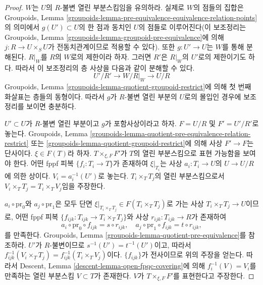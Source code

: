 \begin{proof}
$W$는 $U$의 $R$-불변 열린 부분스킴임을 유의하라. 실제로 $W$의
점들의 집합은 Groupoids, Lemma
\ref{groupoids-lemma-pre-equivalence-equivalence-relation-points}의 의미에서
$g(U') \subset U$의 한 점과 동치인 $U$의 점들로 이루어진다(이
보조정리는 Groupoids, Lemma
\ref{groupoids-lemma-groupoid-pre-equivalence}에 의해
$j : R \to U \times_S U$가 전동치관계이므로 적용할 수 있다).
또한 $g : U' \to U$는 $W$를 통해 분해된다. $R|_W$를 $R$의 $W$로의
제한이라 하자. 그러면 $R'$은 $R|_W$의 $U'$로의 제한이기도 하다.
따라서 이 보조정리의 층 사상을 다음과 같이 분해할 수 있다.
$$
U'/R' \longrightarrow W/R|_W \longrightarrow U/R
$$
Groupoids, Lemma \ref{groupoids-lemma-quotient-groupoid-restrict}에 의해
첫 번째 화살표는 층들의 동형이다. 따라서 $g$가 $R$-불변 열린 부분의
$U$로의 몰입인 경우에 보조정리를 보이면 충분하다.

\medskip\noindent
$U' \subset U$가 $R$-불변 열린 부분이고 $g$가 포함사상이라고 하자.
$F = U/R$ 및 $F' = U'/R'$로 놓는다. Groupoids, Lemma
\ref{groupoids-lemma-quotient-pre-equivalence-relation-restrict} 또는
\ref{groupoids-lemma-quotient-groupoid-restrict}에 의해 사상 $F' \to F$는
단사이다. $\xi \in F(T)$라 하자. $T \times_{\xi, F} F'$가 $T$의 열린
부분스킴으로 표현 가능함을 보여야 한다. 어떤 fppf 피복
$\{f_i : T_i \to T\}$가 존재하여 $\xi|_{T_i}$는 사상
$a_i : T_i \to U$의 $U \to U/R$에 의한 상이다.
$V_i = a_i^{-1}(U')$로 놓는다. $T_i \times_T T_j$의 열린 부분스킴으로서
$V_i \times_T T_j = T_i \times_T V_j$임을 주장한다.

\medskip\noindent
$a_i \circ \text{pr}_0$와 $a_j \circ \text{pr}_1$은 모두 단면
$\xi|_{T_i \times_T T_j} \in F(T_i \times_T T_j)$로 가는 사상
$T_i \times_T T_j \to U$이므로, 어떤 fppf 피복
$\{f_{ijk} : T_{ijk} \to T_i \times_T T_j\}$와 사상
$r_{ijk} : T_{ijk} \to R$가 존재하여
$$
a_i \circ \text{pr}_0 \circ f_{ijk} = s \circ r_{ijk},
\quad
a_j \circ \text{pr}_1 \circ f_{ijk} = t \circ r_{ijk},
$$
를 만족한다. Groupoids, Lemma
\ref{groupoids-lemma-quotient-pre-equivalence}를 참조하라. $U'$가
$R$-불변이므로 $s^{-1}(U') = t^{-1}(U')$이고, 따라서
$f_{ijk}^{-1}(V_i \times_T T_j) = f_{ijk}^{-1}(T_i \times_T V_j)$이다.
$\{f_{ijk}\}$가 전사이므로 위의 주장을 얻는다. 따라서 Descent, Lemma
\ref{descent-lemma-open-fpqc-covering}에 의해 $f_i^{-1}(V) = V_i$를
만족하는 열린 부분스킴 $V \subset T$가 존재한다. $V$가
$T \times_{\xi, F} F'$를 표현한다고 주장한다.


\end{proof}
